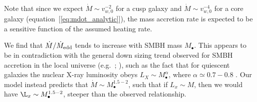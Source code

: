 \documentclass[usenatbib,fleqn]{mn2e}
\newcommand{\Mdot}{\dot{M}}
\newcommand{\eddr}{\dot{M}/\dot{M}_{\rm Edd}}
\newcommand{\rs}{r_s}
\newcommand{\Mbh}[1][]{M_{\bullet#1}}
\newcommand{\soi}{\rm soi}
\newcommand{\rsoi}{r_{\soi}}
\newcommand{\vwO}{v_{w,0}}
\begin{document}
Note that since we expect $\dot{M}\sim\vwO^{-2}$ for a cusp galaxy and
$\dot{M}\sim\vwO^{-4}$ for a core galaxy
(equation~[\ref{eq:mdot_analytic}]), the mass accretion rate is
expected to be a sensitive function of the assumed heating rate.


We find that $\dot{M}/\dot{M}_{\rm edd}$ tends to increase with SMBH
mass $M_{\bullet}$.  This appears to be in contradiction with the
general down sizing trend observed for SMBH accretion in the local
universe (e.g.~\citealt{Heckman+04}; \citealt{Gallo+08}), such as the
fact that for quiescent galaxies the nuclear X-ray luminosity obeys
$L_X \sim \Mbh^\alpha$, where $\alpha\simeq 0.7-0.8$
\citep{MillerGallo+:2014a}.  Our model instead predicts that $\Mdot
\sim \Mbh^{1.5-2}$, such that if $L_x\sim M$, then we would have $\L_x
\sim \Mbh^{1.5-2}$, steeper than the observed relationship. 

\end{document}

